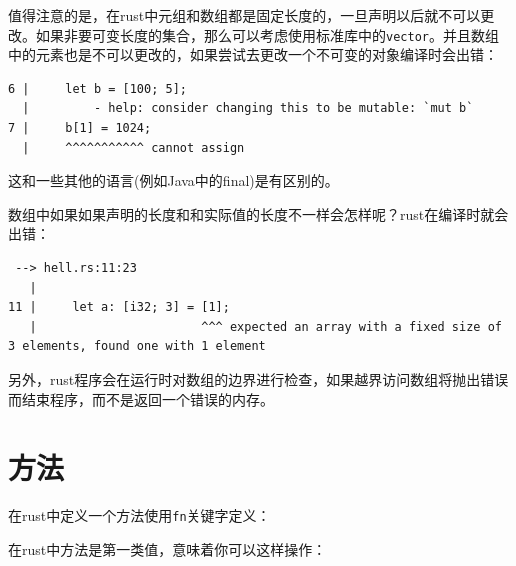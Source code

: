 \documentclass[12pt]{article}
\begin{document}
值得注意的是，在rust中元组和数组都是固定长度的，一旦声明以后就不可以更改。如果非要可变长度的集合，那么可以考虑使用标准库中的\texttt{vector}。并且数组中的元素也是不可以更改的，如果尝试去更改一个不可变的对象编译时会出错：

\begin{verbatim}
6 |     let b = [100; 5];
  |         - help: consider changing this to be mutable: `mut b`
7 |     b[1] = 1024;
  |     ^^^^^^^^^^^ cannot assign
\end{verbatim}

这和一些其他的语言(例如Java中的final)是有区别的。

数组中如果如果声明的长度和和实际值的长度不一样会怎样呢？rust在编译时就会出错：

\begin{verbatim}
 --> hell.rs:11:23
   |
11 |     let a: [i32; 3] = [1];
   |                       ^^^ expected an array with a fixed size of 3 elements, found one with 1 element
\end{verbatim}

另外，rust程序会在运行时对数组的边界进行检查，如果越界访问数组将抛出错误而结束程序，而不是返回一个错误的内存。

\section{方法}\label{ux65b9ux6cd5}

在rust中定义一个方法使用\texttt{fn}关键字定义：

\begin{Shaded}
\begin{Highlighting}[]
\OperatorTok{:} \OperatorTok{,}\OperatorTok{:} \NormalTok{) }\OperatorTok{\{}
    \OperatorTok{=}\OperatorTok{+}
\OperatorTok{\}}

\OperatorTok{:} \OperatorTok{,}\OperatorTok{:} \NormalTok{) }\OperatorTok{{-}\textgreater{}}  \OperatorTok{\{}
\OperatorTok{+}
\OperatorTok{\}}
\end{Highlighting}
\end{Shaded}

在rust中方法是第一类值，意味着你可以这样操作：

\begin{Shaded}
\begin{Highlighting}[]
\OperatorTok{=}\OperatorTok{;}
\OperatorTok{=}\OperatorTok{,}\OperatorTok{;}
\end{Highlighting}
\end{Shaded}
\end{document}
